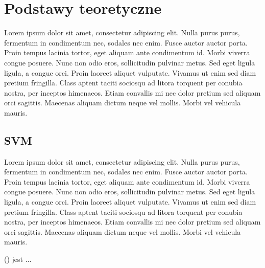 \chapter{Podstawy teoretyczne}
Lorem ipsum dolor sit amet, consectetur adipiscing elit. Nulla purus purus, fermentum in condimentum nec, sodales nec enim. Fusce auctor auctor porta. Proin tempus lacinia tortor, eget aliquam ante condimentum id. Morbi viverra congue posuere. Nunc non odio eros, sollicitudin pulvinar metus. Sed eget ligula ligula, a congue orci. Proin laoreet aliquet vulputate. Vivamus ut enim sed diam pretium fringilla. Class aptent taciti sociosqu ad litora torquent per conubia nostra, per inceptos himenaeos. Etiam convallis mi nec dolor pretium sed aliquam orci sagittis. Maecenas aliquam dictum neque vel mollis. Morbi vel vehicula mauris.

\section{SVM}
Lorem ipsum dolor sit amet, consectetur adipiscing elit. Nulla purus purus, fermentum in condimentum nec, sodales nec enim. Fusce auctor auctor porta. Proin tempus lacinia tortor, eget aliquam ante condimentum id. Morbi viverra congue posuere. Nunc non odio eros, sollicitudin pulvinar metus. Sed eget ligula ligula, a congue orci. Proin laoreet aliquet vulputate. Vivamus ut enim sed diam pretium fringilla. Class aptent taciti sociosqu ad litora torquent per conubia nostra, per inceptos himenaeos. Etiam convallis mi nec dolor pretium sed aliquam orci sagittis. Maecenas aliquam dictum neque vel mollis. Morbi vel vehicula mauris.
    
 () \cite{} jest ...

